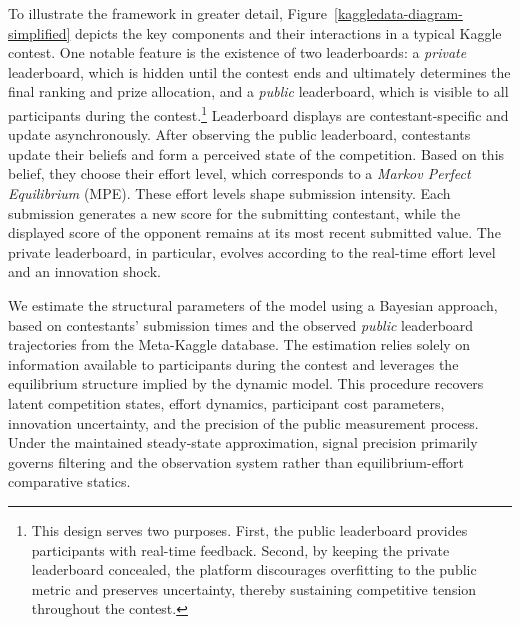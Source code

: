 \documentclass[mnsc]{informs3}
\begin{document}
To illustrate the framework in greater detail, Figure~\ref{kaggledata-diagram-simplified} depicts the key components and their interactions in a typical Kaggle contest.
One notable feature is the existence of two leaderboards: a \textit{private} leaderboard, which is hidden until the contest ends and ultimately determines the final ranking and prize allocation, and a \textit{public} leaderboard, which is visible to all participants during the contest.\footnote{
This design serves two purposes.
First, the public leaderboard provides participants with real-time feedback.
Second, by keeping the private leaderboard concealed, the platform discourages overfitting to the public metric and preserves uncertainty, thereby sustaining competitive tension throughout the contest.
}
Leaderboard displays are contestant-specific and update asynchronously.
After observing the public leaderboard, contestants update their beliefs and form a perceived state of the competition.
Based on this belief, they choose their effort level, which corresponds to a \textit{Markov Perfect Equilibrium} (MPE).
These effort levels shape submission intensity. 
Each submission generates a new score for the submitting contestant, while the displayed score of the opponent remains at its most recent submitted value.
The private leaderboard, in particular, evolves according to the real-time effort level and an innovation shock.


We estimate the structural parameters of the model using a Bayesian approach, based on contestants’ submission times and the observed \textit{public} leaderboard trajectories from the Meta-Kaggle database.
The estimation relies solely on information available to participants during the contest and leverages the equilibrium structure implied by the dynamic model.
This procedure recovers latent competition states, effort dynamics, participant cost parameters, innovation uncertainty, and the precision of the public measurement process. Under the maintained steady-state approximation, signal precision primarily governs filtering and the observation system rather than equilibrium-effort comparative statics.
\end{document}
